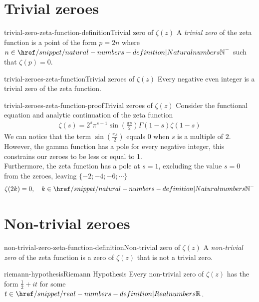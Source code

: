 \documentclass[preview]{standalone}
\begin{document}
\genpage

\section{Trivial zeroes}

\begin{snippetdefinition}{trivial-zero-zeta-function-definition}{Trivial zero of \(\zeta(z)\)}
    A \textit{trivial zero} of the zeta function is a point of the form \(p = 2n\)
    where \(n \in {\naturalnumbers}^-\) such that \(\zeta(p)=0\).
\end{snippetdefinition}

\begin{snippetproposition}{trivial-zeroes-zeta-function}{Trivial zeroes of \(\zeta(z)\)}
    Every negative even integer is a trivial zero of the zeta function.
\end{snippetproposition}

\begin{snippetproof}{trivial-zeroes-zeta-function-proof}{Trivial zeroes of \(\zeta(z)\)}
    Consider the functional equation and analytic continuation of the zeta function
    \begin{align*}
        \zeta(s)=2^s\pi^{s-1}\sin\left(\frac{\pi s}{2}\right)\Gamma(1-s)\zeta(1-s)
    \end{align*}
    We can notice that the term \(\sin\left(\frac{\pi s}{2}\right)\) equals \(0\) when \(s\) is a multiple of \(2\).
    \\
    However, the gamma function has a pole for every negative integer, this constrains our zeroes to be less or equal to 1.\\
    Furthermore, the zeta function has a pole at \(s=1\), excluding the value \(s=0\) from the zeroes, leaving \(\{-2;-4;-6;\cdots\}\)
    \begin{align*}
        \zeta(2k)=0,
        \quad k\in {\naturalnumbers}^{-}
    \end{align*}
\end{snippetproof}

\section{Non-trivial zeroes}

\begin{snippetdefinition}{non-trivial-zero-zeta-function-definition}{Non-trivial zero of \(\zeta(z)\)}
    A \textit{non-trivial zero} of the zeta function is a zero of \(\zeta(z)\)
    that is not a trivial zero.
\end{snippetdefinition}

\begin{snippetproposition}{riemann-hypothesis}{Riemann Hypothesis}
    Every non-trivial zero of \(\zeta(z)\) has the form \(\frac{1}{2} + it\)
    for some \(t \in \realnumbers\).
\end{snippetproposition}

\end{document}

